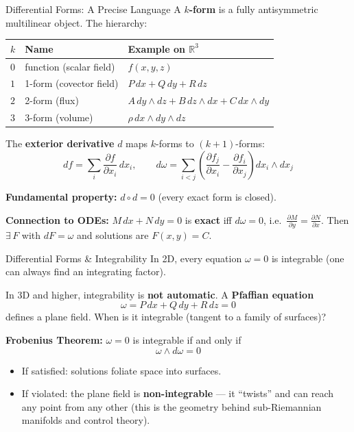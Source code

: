 
\begin{frame}{Differential Forms: A Precise Language}
A \textbf{$k$-form} is a fully antisymmetric multilinear object. The hierarchy:

\vspace{0.2cm}
{\small
\begin{tabular}{lll}
$k$ & Name & Example on $\mathbb{R}^3$ \\
\hline
$0$ & function (scalar field) & $f(x,y,z)$ \\
$1$ & 1-form (covector field) & $P\,dx + Q\,dy + R\,dz$ \\
$2$ & 2-form (flux) & $A\,dy{\wedge}dz + B\,dz{\wedge}dx + C\,dx{\wedge}dy$ \\
$3$ & 3-form (volume) & $\rho\,dx{\wedge}dy{\wedge}dz$ \\
\end{tabular}
}

\vspace{0.2cm}
The \textbf{exterior derivative} $d$ maps $k$-forms to $(k{+}1)$-forms:
\[
df = \sum_i \frac{\partial f}{\partial x_i}\,dx_i, \qquad d\omega = \sum_{i<j}\left(\frac{\partial f_j}{\partial x_i} - \frac{\partial f_i}{\partial x_j}\right) dx_i{\wedge}dx_j
\]

\textbf{Fundamental property:} $d \circ d = 0$ \quad (every exact form is closed).

\vspace{0.2cm}
\textbf{Connection to ODEs:} $M\,dx + N\,dy = 0$ is \textbf{exact} iff $d\omega = 0$,
i.e.\ $\frac{\partial M}{\partial y} = \frac{\partial N}{\partial x}$. Then $\exists\, F$ with $dF = \omega$ and solutions are $F(x,y) = C$.
\end{frame}


\begin{frame}{Differential Forms \& Integrability}
In 2D, every equation $\omega = 0$ is integrable (one can always find an integrating factor).

\vspace{0.3cm}
In 3D and higher, integrability is \textbf{not automatic}. A \textbf{Pfaffian equation}
\[
\omega = P\,dx + Q\,dy + R\,dz = 0
\]
defines a plane field. When is it integrable (tangent to a family of surfaces)?

\vspace{0.3cm}
\textbf{Frobenius Theorem:} $\omega = 0$ is integrable if and only if
\[
\omega \wedge d\omega = 0
\]

\begin{itemize}
    \item If satisfied: solutions foliate space into surfaces.
    \item If violated: the plane field is \textbf{non-integrable} --- it ``twists'' and can reach any point from any other (this is the geometry behind sub-Riemannian manifolds and control theory).
\end{itemize}
\end{frame}



